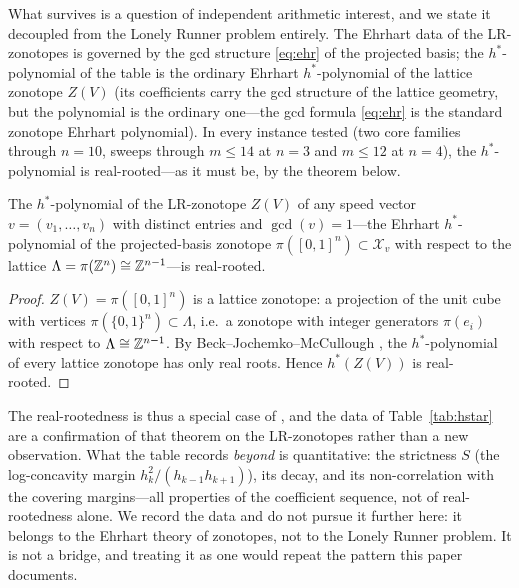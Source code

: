 What survives is a question of independent arithmetic interest, and we
state it decoupled from the Lonely Runner problem entirely. The
Ehrhart data of the LR-zonotopes is governed by the gcd structure
\eqref{eq:ehr} of the projected basis; the $h^*$-polynomial of the table
is the ordinary Ehrhart $h^*$-polynomial of the lattice zonotope $Z(V)$
(its coefficients carry the gcd structure of the lattice geometry, but
the polynomial is the ordinary one---the gcd formula \eqref{eq:ehr} is
the standard zonotope Ehrhart polynomial). In every instance tested (two
core families through $n=10$, sweeps through $m\le14$ at $n=3$ and
$m\le12$ at $n=4$), the $h^*$-polynomial is real-rooted---as it must be,
by the theorem below.

\begin{corollary}\label{cor:hstarRR}
The $h^*$-polynomial of the LR-zonotope $Z(V)$ of any speed vector
$v=(v_1,\dots,v_n)$ with distinct entries and $\gcd(v)=1$---the
Ehrhart $h^*$-polynomial of the projected-basis zonotope
$\pi([0,1]^n)\subset\mathcal{X}_v$ with respect to the lattice
$\Lambda=\pi(\mathbb{Z}^n)\cong\mathbb{Z}^{n-1}$---is real-rooted.
\end{corollary}

\begin{proof}
$Z(V)=\pi([0,1]^n)$ is a lattice zonotope: a projection of the unit cube
with vertices $\pi(\{0,1\}^n)\subset\Lambda$, i.e.\ a zonotope with
integer generators $\pi(e_i)$ with respect to $\Lambda\cong\mathbb{Z}^{n-1}$. By
Beck--Jochemko--McCullough \cite{BJM}, the $h^*$-polynomial of every
lattice zonotope has only real roots. Hence $h^*(Z(V))$ is real-rooted.
\end{proof}

The real-rootedness is thus a special case of \cite{BJM}, and the data
of Table~\ref{tab:hstar} are a confirmation of that theorem on the
LR-zonotopes rather than a new observation. What the table records
\emph{beyond} \cite{BJM} is quantitative: the strictness $S$ (the
log-concavity margin $h_k^2/(h_{k-1}h_{k+1})$), its decay, and its
non-correlation with the covering margins---all properties of the
coefficient sequence, not of real-rootedness alone. We record the data
and do not pursue it further here: it belongs to the Ehrhart theory of
zonotopes, not to the Lonely Runner problem. It is not a bridge, and
treating it as one would repeat the pattern this paper documents.
